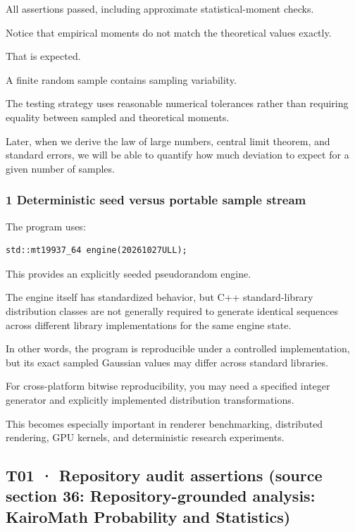 All assertions passed, including approximate statistical-moment checks.

Notice that empirical moments do not match the theoretical values exactly.

That is expected.

A finite random sample contains sampling variability.

The testing strategy uses reasonable numerical tolerances rather than requiring equality between sampled and theoretical moments.

Later, when we derive the law of large numbers, central limit theorem, and standard errors, we will be able to quantify how much deviation to expect for a given number of samples.

\subsubsection{1 Deterministic seed versus portable sample stream}\label{02-foundations-ii-ch039-deterministic-seed-versus-portable-sample-stream}

The program uses:

\begin{verbatim}
std::mt19937_64 engine(20261027ULL);
\end{verbatim}

This provides an explicitly seeded pseudorandom engine.

The engine itself has standardized behavior, but C++ standard-library distribution classes are not generally required to generate identical sequences across different library implementations for the same engine state.

In other words, the program is reproducible under a controlled implementation, but its exact sampled Gaussian values may differ across standard libraries.

For cross-platform bitwise reproducibility, you may need a specified integer generator and explicitly implemented distribution transformations.

This becomes especially important in renderer benchmarking, distributed rendering, GPU kernels, and deterministic research experiments.

\subsection{T01 · Repository audit assertions (source section 36: Repository-grounded analysis: KairoMath Probability and Statistics)}\label{02-foundations-ii-ch039-t01-repository-audit-assertions-source-section-36-repository-grounded-analysis-kairomath-probability-and-statistics}

